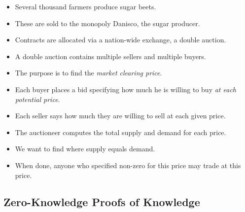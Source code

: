 \begin{frame}
  \begin{example}
    \begin{itemize}
      \item Several thousand farmers produce sugar beets.
      \item These are sold to the monopoly Danisco, the sugar producer.

        \pause{}

      \item Contracts are allocated via a nation-wide exchange, a double 
        auction.

      \item A double auction contains multiple sellers and multiple buyers.

      \item The purpose is to find the \emph{market clearing price}.

    \end{itemize}
  \end{example}
\end{frame}

\begin{frame}
  \begin{example}
    \begin{itemize}
      \item Each buyer places a bid specifying how much he is willing to buy 
        \emph{at each potential price}.

      \item Each seller says how much they are willing to sell at each given 
        price.

        \pause{}

      \item The auctioneer computes the total supply and demand for each price.

      \item We want to find where supply equals demand.

        \pause{}

      \item When done, anyone who specified non-zero for this price may trade 
        at this price.
    \end{itemize}
  \end{example}
\end{frame}

\subsection{Zero-Knowledge Proofs of Knowledge}

\begin{frame}
\end{frame}




\begin{frame}[allowframebreaks]
  \printbibliography{}
\end{frame}

